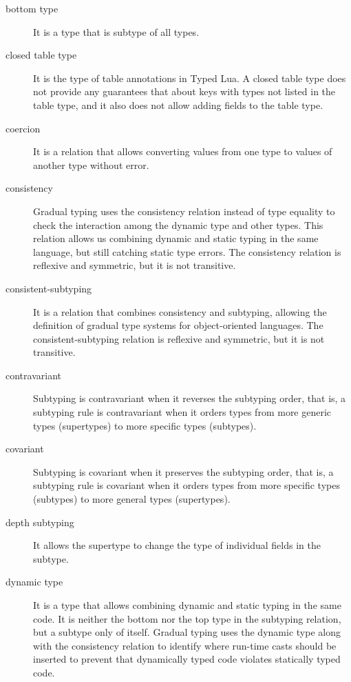 \begin{description}
\item[bottom type] It is a type that is subtype of all types.

\item[closed table type] It is the type of table annotations in Typed Lua.
A closed table type does not provide any guarantees that about keys
with types not listed in the table type, and it also does not
allow adding fields to the table type. 

\item[coercion] It is a relation that allows converting values from one type to values
of another type without error.

\item[consistency] Gradual typing uses the consistency relation instead of type equality
to check the interaction among the dynamic type and other types.
This relation allows us combining dynamic and static typing in the
same language, but still catching static type errors.
The consistency relation is reflexive and symmetric, but it is not transitive.

\item[consistent-subtyping] It is a relation that combines consistency and subtyping, allowing
the definition of gradual type systems for object-oriented languages.
The consistent-subtyping relation is reflexive and symmetric, but it is not transitive.

\item[contravariant] Subtyping is contravariant when it reverses the subtyping order,
that is, a subtyping rule is contravariant when it orders
types from more generic types (supertypes) to more specific types (subtypes).

\item[covariant] Subtyping is covariant when it preserves the subtyping order,
that is, a subtyping rule is covariant when it orders
types from more specific types (subtypes) to more general types (supertypes).

\item[depth subtyping] It allows the supertype to change the type of individual fields in the subtype.

\item[dynamic type] It is a type that allows combining dynamic and static typing in the same code.
It is neither the bottom nor the top type in the subtyping relation, but
a subtype only of itself.
Gradual typing uses the dynamic type along with the consistency relation to
identify where run-time casts should be inserted to prevent that dynamically
typed code violates statically typed code.


\end{description}
